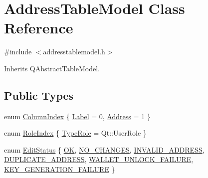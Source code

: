 \hypertarget{class_address_table_model}{}\section{Address\+Table\+Model Class Reference}
\label{class_address_table_model}


{\ttfamily \#include $<$addresstablemodel.\+h$>$}



Inherits Q\+Abstract\+Table\+Model.

\subsection*{Public Types}
\begin{DoxyCompactItemize}
\item 
enum \mbox{\hyperlink{class_address_table_model_a432276ac4504e926466072561c5ddb33}{Column\+Index}} \{ \mbox{\hyperlink{class_address_table_model_a432276ac4504e926466072561c5ddb33aaf8f25cebb70b8a394d6c0f23c941a32}{Label}} = 0, 
\mbox{\hyperlink{class_address_table_model_a432276ac4504e926466072561c5ddb33a8e0abf98768fd0897965974d51a825da}{Address}} = 1
 \}
\item 
enum \mbox{\hyperlink{class_address_table_model_a083a01bdd3351555760f203c78c992d7}{Role\+Index}} \{ \mbox{\hyperlink{class_address_table_model_a083a01bdd3351555760f203c78c992d7ab65a2b297bf0f2b7e3786e2e1d2b84af}{Type\+Role}} = Qt\+::User\+Role
 \}
\item 
enum \mbox{\hyperlink{class_address_table_model_a3d502b85fc09461e779dae4589c29956}{Edit\+Status}} \{ \newline
\mbox{\hyperlink{class_address_table_model_a3d502b85fc09461e779dae4589c29956af4012fcd28039528046c825a7370ad95}{OK}}, 
\mbox{\hyperlink{class_address_table_model_a3d502b85fc09461e779dae4589c29956a236bb34532175071bf068f4c614f724c}{N\+O\+\_\+\+C\+H\+A\+N\+G\+ES}}, 
\mbox{\hyperlink{class_address_table_model_a3d502b85fc09461e779dae4589c29956a7e1e745ad0209b0cd8dd5866a7615021}{I\+N\+V\+A\+L\+I\+D\+\_\+\+A\+D\+D\+R\+E\+SS}}, 
\mbox{\hyperlink{class_address_table_model_a3d502b85fc09461e779dae4589c29956af9cc220dea0573d7819eebfa84c1691f}{D\+U\+P\+L\+I\+C\+A\+T\+E\+\_\+\+A\+D\+D\+R\+E\+SS}}, 
\newline
\mbox{\hyperlink{class_address_table_model_a3d502b85fc09461e779dae4589c29956a164544f37fe7cfbf17283015eca6fdb3}{W\+A\+L\+L\+E\+T\+\_\+\+U\+N\+L\+O\+C\+K\+\_\+\+F\+A\+I\+L\+U\+RE}}, 
\mbox{\hyperlink{class_address_table_model_a3d502b85fc09461e779dae4589c29956a9e181f9108c727771403c11c6a9a62dd}{K\+E\+Y\+\_\+\+G\+E\+N\+E\+R\+A\+T\+I\+O\+N\+\_\+\+F\+A\+I\+L\+U\+RE}}
 \}
\end{DoxyCompactItemize}
